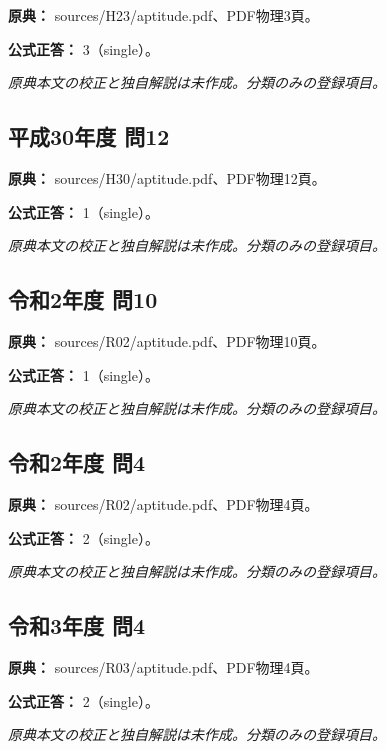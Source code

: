 \noindent\textbf{原典：} sources/H23/aptitude.pdf、PDF物理3頁。

\textbf{公式正答：} 3（single）。

\par\textit{原典本文の校正と独自解説は未作成。分類のみの登録項目。}

\subsection{平成30年度 問12}
\label{q:h30-reg-apt-12}

\noindent\textbf{原典：} sources/H30/aptitude.pdf、PDF物理12頁。

\textbf{公式正答：} 1（single）。

\par\textit{原典本文の校正と独自解説は未作成。分類のみの登録項目。}

\subsection{令和2年度 問10}
\label{q:r02-reg-apt-10}

\noindent\textbf{原典：} sources/R02/aptitude.pdf、PDF物理10頁。

\textbf{公式正答：} 1（single）。

\par\textit{原典本文の校正と独自解説は未作成。分類のみの登録項目。}

\subsection{令和2年度 問4}
\label{q:r02-reg-apt-04}

\noindent\textbf{原典：} sources/R02/aptitude.pdf、PDF物理4頁。

\textbf{公式正答：} 2（single）。

\par\textit{原典本文の校正と独自解説は未作成。分類のみの登録項目。}

\subsection{令和3年度 問4}
\label{q:r03-reg-apt-04}

\noindent\textbf{原典：} sources/R03/aptitude.pdf、PDF物理4頁。

\textbf{公式正答：} 2（single）。

\par\textit{原典本文の校正と独自解説は未作成。分類のみの登録項目。}

